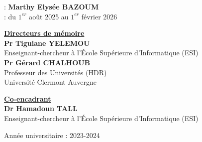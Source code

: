 \documentclass[a4paper,12pt]{report}
\begin{document}
\begin{titlepage}
	{}:  {\bfseries Marthy Elysée BAZOUM}\\[0.3cm]
	{} :  du $1^{er}$ août 2025 au $1^{er}$ février 2026\\[0.9cm]
		\begin{minipage}{1\textwidth}
			\begin{minipage}[t]{0.48\textwidth}
				{\color{customBlue} \underline{\textbf{Directeurs de mémoire}}} \\
				\textbf{Pr Tiguiane YELEMOU} \\
				Enseignant-chercheur à l'École
				Supérieure d'Informatique (ESI)\\[8pt]
				\textbf{Pr Gérard CHALHOUB} \\
				Professeur des Universités (HDR)\\
				Université Clermont Auvergne
			\end{minipage}
			\hfill
			\begin{minipage}[t]{0.48\textwidth}
				{\color{customBlue} \underline{\textbf{Co-encadrant}}} \\
				\textbf{Dr Hamadoun TALL} \\
				Enseignant-chercheur à l'École
				Supérieure d'Informatique (ESI)
			\end{minipage}
		\end{minipage}
		
		\vfill
		
		{\large Année universitaire : 2023-2024}
		
		\vspace*{1cm}
	\end{titlepage}
	
	
	\newpage
\end{document}
